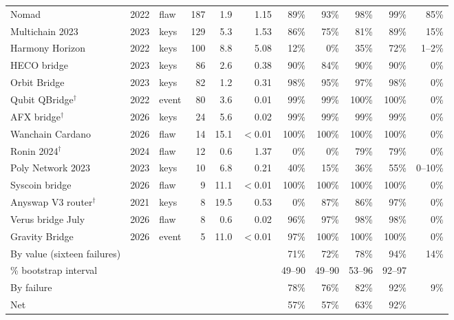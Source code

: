 \begin{table}[t]
\begin{tabular}{@{}l l l r r r r r r r r@{}}
Nomad & 2022 & flaw & 187 & 1.9 & 1.15 & 89\% & 93\% & 98\% & 99\% & 85\% \\
Multichain 2023 & 2023 & keys & 129 & 5.3 & 1.53 & 86\% & 75\% & 81\% & 89\% & 15\% \\
Harmony Horizon & 2022 & keys & 100 & 8.8 & 5.08 & 12\% & 0\% & 35\% & 72\% & 1--2\% \\
HECO bridge & 2023 & keys & 86 & 2.6 & 0.38 & 90\% & 84\% & 90\% & 90\% & 0\% \\
Orbit Bridge & 2023 & keys & 82 & 1.2 & 0.31 & 98\% & 95\% & 97\% & 98\% & 0\% \\
Qubit QBridge$^\dagger$ & 2022 & event & 80 & 3.6 & 0.01 & 99\% & 99\% & 100\% & 100\% & 0\% \\
AFX bridge$^\dagger$ & 2026 & keys & 24 & 5.6 & 0.02 & 99\% & 99\% & 99\% & 99\% & 0\% \\
Wanchain Cardano & 2026 & flaw & 14 & 15.1 & $<$0.01 & 100\% & 100\% & 100\% & 100\% & 0\% \\
Ronin 2024$^\dagger$ & 2024 & flaw & 12 & 0.6 & 1.37 & 0\% & 0\% & 79\% & 79\% & 0\% \\
Poly Network 2023 & 2023 & keys & 10 & 6.8 & 0.21 & 40\% & 15\% & 36\% & 55\% & 0--10\% \\
Syscoin bridge & 2026 & flaw & 9 & 11.1 & $<$0.01 & 100\% & 100\% & 100\% & 100\% & 0\% \\
Anyswap V3 router$^\dagger$ & 2021 & keys & 8 & 19.5 & 0.53 & 0\% & 87\% & 86\% & 97\% & 0\% \\
Verus bridge July & 2026 & flaw & 8 & 0.6 & 0.02 & 96\% & 97\% & 98\% & 98\% & 0\% \\
Gravity Bridge & 2026 & event & 5 & 11.0 & $<$0.01 & 97\% & 100\% & 100\% & 100\% & 0\% \\
\midrule
By value (sixteen failures) & & & & & & 71\% & 72\% & 78\% & 94\% & 14\% \\
\quad 90\% bootstrap interval & & & & & & 49--90 & 49--90 & 53--96 & 92--97 &  \\
By failure & & & & & & 78\% & 76\% & 82\% & 92\% & 9\% \\
Net & & & & & & 57\% & 57\% & 63\% & 92\% &  \\
\bottomrule
\end{tabular}
\end{table}

